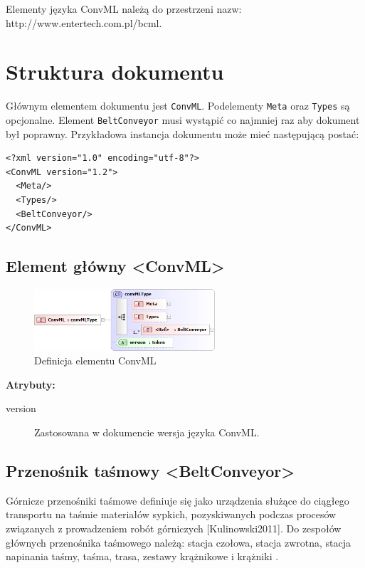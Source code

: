 \documentclass[12pt,a4paper]{article}
\begin{document}
Elementy języka ConvML należą do przestrzeni nazw:
http://www.entertech.com.pl/bcml.


\section{Struktura dokumentu}
Głównym elementem dokumentu jest {\tt ConvML}.  Podelementy {\tt Meta} oraz
{\tt Types} są opcjonalne. Element {\tt BeltConveyor} musi wystąpić co
najmniej raz aby dokument był poprawny.  Przykładowa instancja dokumentu może
mieć następującą postać:

\begin{verbatim}
<?xml version="1.0" encoding="utf-8"?>
<ConvML version="1.2">
  <Meta/>
  <Types/>
  <BeltConveyor/>
</ConvML>
\end{verbatim}  


\subsection{Element główny <ConvML>}

\begin{figure}[H]
  \centering
  \includegraphics[width=0.6\textwidth]{png/convml_xsd2}
  \caption{Definicja elementu ConvML}
  \label{fig:convml-xsd}
\end{figure}

\noindent\textbf{Atrybuty:}
\begin{description}
\item[version] Zastosowana w dokumencie wersja języka ConvML.
\end{description}


\subsection{Przenośnik taśmowy <BeltConveyor>}\label{sec:BeltConveyor}
Górnicze przenośniki taśmowe definiuje się jako urządzenia służące do ciągłego
transportu na taśmie materiałów sypkich, pozyskiwanych podczas procesów
związanych z prowadzeniem robót górniczych [Kulinowski2011].  Do zespołów
głównych przenośnika taśmowego należą: stacja czołowa, stacja zwrotna, stacja
napinania taśmy, taśma, trasa, zestawy krążnikowe i krążniki
\cite{Antoniak2005}.
\end{document}
